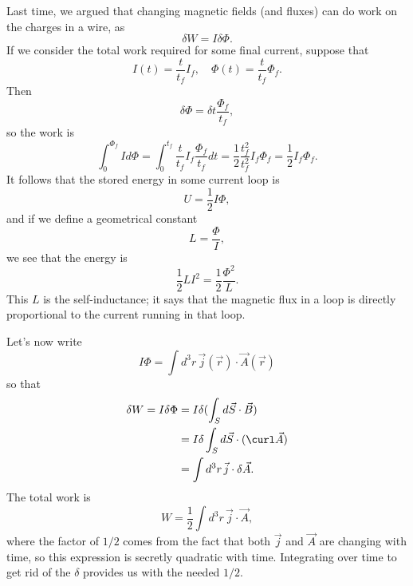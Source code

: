 Last time, we argued that changing magnetic fields (and fluxes) can do work on the charges in a wire, as
\begin{equation}
    \delta W = I\delta \Phi.
\end{equation}
If we consider the total work required for some final current, suppose that
\begin{equation}
    I(t)=\frac{t}{t_f} I_f, \quad \Phi(t) = \frac{t}{t_f} \Phi_f.
\end{equation}
Then 
\begin{equation}
    \delta \Phi = \delta t \frac{\Phi_f}{t_f},
\end{equation}
so the work is
\begin{equation}
    \int_0^{\Phi_f}Id\Phi = \int_0^{t_f} \frac{t}{t_f} I_f \frac{\Phi_f}{t_f} dt = \frac{1}{2} \frac{t_f^2}{t_f^2} I_f \Phi_f=\frac{1}{2}I_f \Phi_f.
\end{equation}
It follows that the stored energy in some current loop is
\begin{equation}
    U=\frac{1}{2}I\Phi,
\end{equation}
and if we define a geometrical constant
\begin{equation}
    L=\frac{\Phi}{I},
\end{equation}
we see that the energy is
\begin{equation}
    \frac{1}{2}LI^2 = \frac{1}{2}\frac{\Phi^2}{L}.
\end{equation}
This $L$ is the self-inductance; it says that the magnetic flux in a loop is directly proportional to the current running in that loop.

Let's now write
\begin{equation}
    I\Phi = \int d^3r \, \vec j(\vec r) \cdot \vec A(\vec r)
\end{equation}
so that
\begin{align*}
    \delta W = I \delta \Phi &= I\delta(\int_S d\vec S \cdot \vec B)\\
        &= I\delta \int_S d\vec S\cdot (\curl \vec A)\\
        &=\int d^3r \, \vec j \cdot \delta \vec A.
\end{align*}
The total work is
\begin{equation}
    W= \frac{1}{2}\int d^3r \, \vec j \cdot \vec A,
\end{equation}
where the factor of $1/2$ comes from the fact that both $\vec j$ and $\vec A$ are changing with time, so this expression is secretly quadratic with time. Integrating over time to get rid of the $\delta$ provides us with the needed $1/2$.

